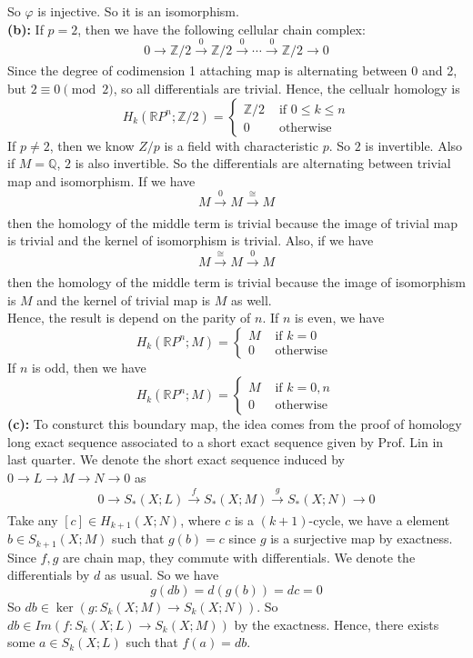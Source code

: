 \documentclass[12pt]{amsart}
\newcommand{\R}{\mathbb{R}}
\newcommand{\Q}{\mathbb{Q}}
\newcommand{\Z}{\mathbb{Z}}
\begin{document}
So $\varphi$ is injective. So it is an isomorphism.
\\\textbf{(b):} If $p=2$, then we have the following cellular chain complex:
\[0\to \Z/2\xrightarrow[]{0}\Z/2\xrightarrow[]{0}\cdots \xrightarrow[]{0}\Z/2\to 0\]
Since the degree of codimension 1 attaching map is alternating between 0 and 2, but $2\equiv 0\pmod 2$, so all differentials are trivial. Hence, the cellualr homology is
\[H_k(\R P^n;\Z/2)=\begin{cases}
        \Z/2 & \text{ if }0\leq k\leq n \\
        0    & \text{ otherwise }
    \end{cases}\]
If $p\neq 2$, then we know $Z/p$ is a field with characteristic $p$. So $2$ is invertible.  Also if $M=\Q$, $2$ is also invertible. So the differentials are alternating between trivial map and isomorphism. If we have
\[M\xrightarrow[]{0}M\xrightarrow[]{\cong}M\]
then the homology of the middle term is trivial because the image of trivial map is trivial and the kernel of isomorphism is trivial. Also, if we have
\[M\xrightarrow[]{\cong}M\xrightarrow[]{0}M\]
then the homology of the middle term is trivial because the image of isomorphism is $M$ and the kernel of trivial map is $M$ as well.\\
Hence, the result is depend on the parity of $n$. If $n$ is even, we have
\[H_k(\R P^n;M)=\begin{cases}
        M & \text{ if } k=0    \\
        0 & \text{ otherwise }
    \end{cases}\]
If $n$ is odd, then we have
\[H_k(\R P^n;M)=\begin{cases}
        M & \text{ if } k=0,n  \\
        0 & \text{ otherwise }
    \end{cases}\]
\textbf{(c):} To consturct this boundary map, the idea comes from the proof of homology long exact sequence associated to a short exact sequence given by Prof. Lin in last quarter.
We denote the short exact sequence induced by $0\to L\to M\to N\to 0$ as
\[0\to S_\ast (X;L)\xrightarrow[]{f}S_\ast(X;M)\xrightarrow[]{g}S_\ast(X;N)\to 0\]
Take any $[c]\in H_{k+1}(X;N)$, where $c$ is a $(k+1)$-cycle, we have a element $b\in S_{k+1}(X;M)$ such that $g(b)=c$ since $g$ is a surjective map by exactness. Since $f,g$ are chain map, they commute with differentials. We denote the differentials by $d$ as usual. So we have
\[g(db)=d(g(b))=dc=0\]
So $db\in \ker(g:S_k(X;M)\to S_k(X;N))$. So $db\in Im(f:S_k(X;L)\to S_k(X;M))$ by the exactness. Hence, there exists some $a\in S_k(X;L)$ such that $f(a)=db$.\\
\end{document}
